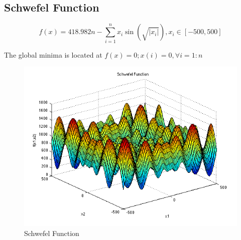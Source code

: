 \documentclass{article}
\begin{document}
\subsection{Schwefel Function\cite{schwef}}

$$
f(x) = 418.982n - \sum_{i=1}^n{x_i\sin(\sqrt{\left|x_i\right|})},
x_i \in \left[ -500 , 500 \right]
$$

The global minima is located at $f(x)=0; x(i)=0,  \forall i=1:n $

\begin{figure}[!h]
  \includegraphics[width=\textwidth,height=\textheight,keepaspectratio]{schwef.png}
  \caption{Schwefel Function\cite{schwef_img}}
\end{figure}
\end{document}
